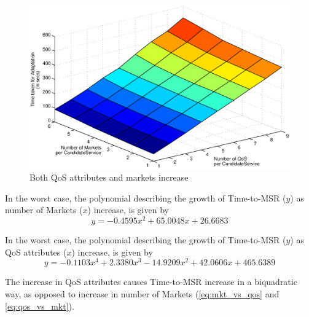 \documentclass[10pt,journal,compsoc]{IEEEtran}
\begin{document}
\begin{figure}[htbp]
	\centering
	\includegraphics[clip, trim=0cm 12cm 2cm 5cm, scale=0.4]{Figure23.eps}
	\caption{Both QoS attributes and markets increase \label{fig:qos_and_mkts_scaling}}
\end{figure}

In the worst case, the polynomial describing the growth of Time-to-MSR ($y$) as number of Markets ($x$) increase, is given by
\begin{equation}
    y = -0.4595x^{2} +  65.0048x +  26.6683 \label{eq:mkt_vs_qos}
\end{equation}

In the worst case, the polynomial describing the growth of Time-to-MSR ($y$) as QoS attributes ($x$) increase, is given by
\begin{equation}
    y =  -0.1103x^{4} +   2.3380x^{3} - 14.9209x^{2} +  42.0606x + 465.6389 \label{eq:qos_vs_mkt}
\end{equation}

The increase in QoS attributes causes Time-to-MSR increase in a biquadratic way, as opposed to increase in number of Markets (\autoref{eq:mkt_vs_qos} and \autoref{eq:qos_vs_mkt}). 
\end{document}
